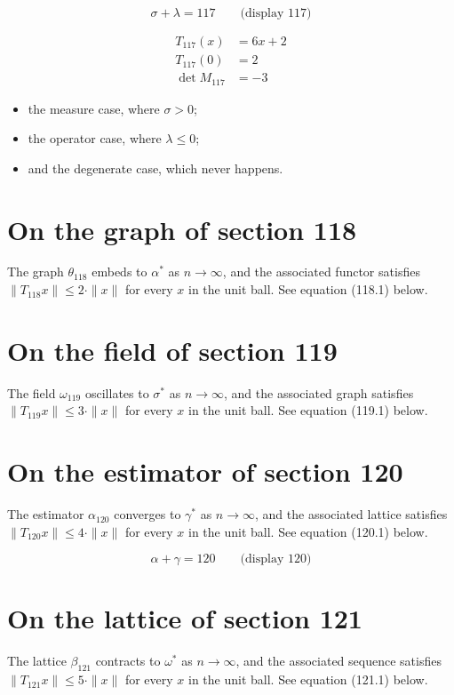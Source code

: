 \documentclass{article}
\begin{document}
$$
\sigma + \lambda = 117 \qquad \text{(display 117)}
$$

\begin{align}
T_{117}(x) &= 6 x + 2 \\
T_{117}(0) &= 2 \\
\det M_{117} &= -3
\end{align}

\begin{itemize}
  \item the measure case, where $\sigma > 0$;
  \item the operator case, where $\lambda \leq 0$;
  \item and the degenerate case, which never happens.
\end{itemize}

\section{On the graph of section 118}
The graph $\theta_{118}$ embeds to $\alpha^{*}$ as $n \to \infty$,
and the associated functor satisfies $\|T_{118} x\| \leq 2 \cdot \|x\|$
for every $x$ in the unit ball. See equation (118.1) below.

\section{On the field of section 119}
The field $\omega_{119}$ oscillates to $\sigma^{*}$ as $n \to \infty$,
and the associated graph satisfies $\|T_{119} x\| \leq 3 \cdot \|x\|$
for every $x$ in the unit ball. See equation (119.1) below.

\section{On the estimator of section 120}
The estimator $\alpha_{120}$ converges to $\gamma^{*}$ as $n \to \infty$,
and the associated lattice satisfies $\|T_{120} x\| \leq 4 \cdot \|x\|$
for every $x$ in the unit ball. See equation (120.1) below.

$$
\alpha + \gamma = 120 \qquad \text{(display 120)}
$$

\section{On the lattice of section 121}
The lattice $\beta_{121}$ contracts to $\omega^{*}$ as $n \to \infty$,
and the associated sequence satisfies $\|T_{121} x\| \leq 5 \cdot \|x\|$
for every $x$ in the unit ball. See equation (121.1) below.
\end{document}
